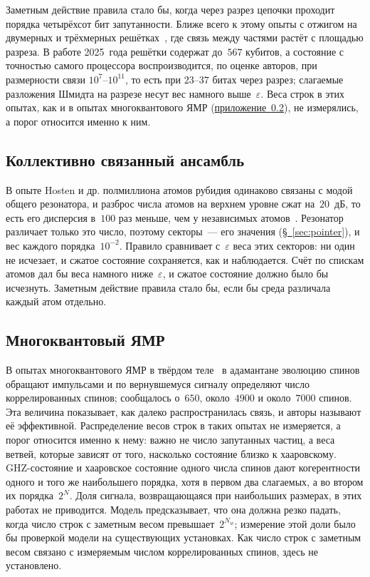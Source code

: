 \documentclass[11pt,a4paper]{article}
\begin{document}
Заметным действие правила стало бы, когда через разрез цепочки проходит порядка четырёхсот бит запутанности. Ближе всего к этому опыты с отжигом на двумерных и трёхмерных решётках~\cite{king2023,king2025}, где связь между частями растёт с площадью разреза. В работе 2025~года решётки содержат до~$567$ кубитов, а состояние с точностью самого процессора воспроизводится, по оценке авторов, при размерности связи $10^{7}$--$10^{11}$, то есть при $23$--$37$ битах через разрез; слагаемые разложения Шмидта на разрезе несут вес намного выше~$\varepsilon$. Веса строк в этих опытах, как и в опытах многоквантового ЯМР (\hyperref[sec:nmr]{приложение~\ref*{sec:nmr}}), не измерялись, а порог относится именно к ним.

\subsection{Коллективно связанный ансамбль}
\label{sec:squeezed}

В опыте Hosten и др. полмиллиона атомов рубидия одинаково связаны с модой общего резонатора, и разброс числа атомов на верхнем уровне сжат на~$20$~дБ, то есть его дисперсия в~$100$ раз меньше, чем у независимых атомов~\cite{hosten2016,hosten2016a}. Резонатор различает только это число, поэтому секторы~--- его значения (\hyperref[sec:pointer]{\S~\ref*{sec:pointer}}), и вес каждого порядка~$10^{-2}$. Правило сравнивает с~$\varepsilon$ веса этих секторов: ни один не исчезает, и сжатое состояние сохраняется, как и наблюдается. Счёт по спискам атомов дал бы веса намного ниже~$\varepsilon$, и сжатое состояние должно было бы исчезнуть. Заметным действие правила стало бы, если бы среда различала каждый атом отдельно.

\subsection{Многоквантовый ЯМР}
\label{sec:nmr}

В опытах многоквантового ЯМР в твёрдом теле~\cite{krojanski2004,krojanski2006,alvarez2015} в адамантане эволюцию спинов обращают импульсами и по вернувшемуся сигналу определяют число коррелированных спинов; сообщалось о~$650$, около~$4900$ и около~$7000$ спинов. Эта величина показывает, как далеко распространилась связь, и авторы называют её эффективной. Распределение весов строк в таких опытах не измеряется, а порог относится именно к нему: важно не число запутанных частиц, а веса ветвей, которые зависят от того, насколько состояние близко к хааровскому. GHZ-состояние и хааровское состояние одного числа спинов дают когерентности одного и того же наибольшего порядка, хотя в первом два слагаемых, а во втором их порядка~$2^N$. Доля сигнала, возвращающаяся при наибольших размерах, в этих работах не приводится. Модель предсказывает, что она должна резко падать, когда число строк с заметным весом превышает~$2^{N_w}$; измерение этой доли было бы проверкой модели на существующих установках. Как число строк с заметным весом связано с измеряемым числом коррелированных спинов, здесь не установлено.
\end{document}
